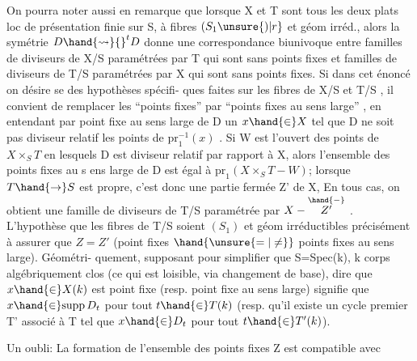 
On pourra noter aussi en remarque que lorsque X et T sont tous les
deux plats loc de présentation finie sur S, à fibres $(S_1\unsure{)|r}$ et géom irréd.,
alors la symétrie $D \hand{\rightsquigarrow} {}^{t}D$ donne une correspondance biunivoque entre
familles de diviseurs de X/S paramétrées par T qui sont sans points fixes
et familles de diviseurs de T/S paramétrées par X qui sont sans points
fixes. Si dans cet énoncé on désire se  des hypothèses spécifi-%
ques faites sur les fibres de X/S et T/S , il convient de remplacer
les ``points fixes'' par ``points fixes au sens large'' , en entendant par
point fixe au sens large de D un $x \hand{\in} X$ tel que D ne soit pas diviseur
 relatif   les points de $\mathrm{pr}_1^{-1}(x)$ . Si W est l'ouvert des
points de $X\times_S T$ en lesquels D est  diviseur  relatif par
rapport à X, alors l'ensemble des points fixes au s ens large de D est
 égal à $\mathrm{pr}_1(X\times_S T - W)$; lorsque $T \hand{\to} S$ est propre, c'est donc
une partie fermée Z' de X,  En tous cas, on obtient une
famille de diviseurs de T/S paramétrée par $X-\overset{\hand{\relbar}}{Z'}$ . L'hypothèse que les
fibres de T/S soient $(S_1)$ et géom irréductibles   précisément à
assurer que $Z=Z'$ (point fixes $\hand{\unsure{=|\ne}}$ points fixes au sens large). Géométri-%
quement, supposant pour simplifier que S=Spec(k), k corps algébriquement
clos (ce qui est loisible,  via changement de base), dire que $x \hand{\in} X(k)$
est point fixe (resp. point fixe au sens large) signifie que $x \hand{\in} \mathrm{supp}\, D_t$
pour tout $t \hand{\in} T(k)$ (resp. qu'il existe un cycle premier T' associé à T
tel que $x \hand{\in} D_t$ pour tout $t \hand{\in} T'(k)$).

 \margin{$\|$} Un oubli: 
La formation de l'ensemble des points fixes Z est compatible avec

